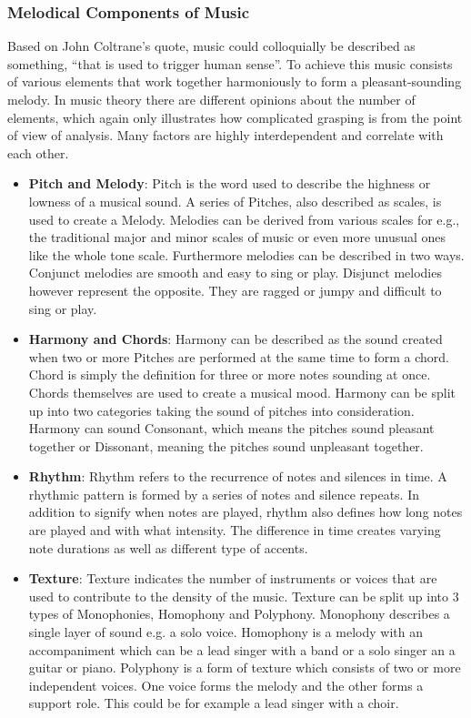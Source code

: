 \subsubsection{Melodical Components of Music}
Based on John Coltrane's quote, music could colloquially be described as something,
“that is used to trigger human sense”.\cite{Havers2021Sax}
To achieve this music consists of various elements that work together harmoniously to form
a pleasant-sounding melody.
In music theory there are different opinions about the number of elements,
which again only illustrates how complicated grasping is from the point of view of analysis.
Many factors are highly interdependent and correlate with each other. 
\begin{itemize}
    \item \textbf{Pitch and Melody}: Pitch is the word used to describe the highness or lowness of
    a musical sound.
    A series of Pitches, also described as scales, is used to create a Melody.
    Melodies can be derived from various scales for e.g., the traditional major and minor scales
    of music or even more unusual ones like the whole tone scale.\cite[86]{Hemming2015}
    Furthermore melodies can be described in two ways.
    Conjunct melodies are smooth and easy to sing or play.
    Disjunct melodies however represent the opposite.
    They are ragged or jumpy and difficult to sing or play.

    \item \textbf{Harmony and Chords}: Harmony can be described as the sound created when two or more
    Pitches are performed at the same time to form a chord.
    Chord is simply the definition for three or more notes sounding at once.
    Chords themselves are used to create a musical mood.
    Harmony can be split up into two categories taking the sound of pitches into consideration.
    Harmony can sound Consonant, which means the pitches sound pleasant together or Dissonant,
    meaning the pitches sound unpleasant together.\cite[94]{Hemming2015}

    \item \textbf{Rhythm}: Rhythm refers to the recurrence of notes and silences in time.
    A rhythmic pattern is formed by a series of notes and silence repeats.
    In addition to signify when notes are played, rhythm also defines how long notes are played and
    with what intensity.
    The difference in time creates varying note durations as well as different type of accents.\cite{MilneMusicFundamentals}

    \item \textbf{Texture}: Texture indicates the number of instruments or voices that are used
    to contribute to the density of the music. Texture can be split up into 3 types of Monophonies,
    Homophony and Polyphony.
    Monophony describes a single layer of sound e.g. a solo voice.
    Homophony is a melody with an accompaniment which can be a lead singer with a band or a solo
    singer an a guitar or piano.
    Polyphony is a form of texture which consists of two or more independent voices.
    One voice forms the melody and the other forms a support role.
    This could be for example a lead singer with a choir.\cite{2019ShawMusic}


\end{itemize}
